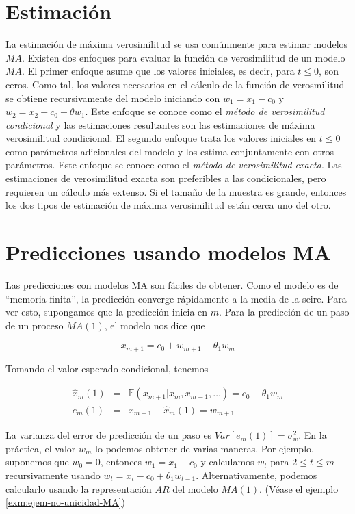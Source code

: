 \documentclass[12pt,]{krantz}
\theoremstyle{definition}
\theoremstyle{definition}
\theoremstyle{definition}
\theoremstyle{remark}
\begin{document}
\section{Estimación}\label{estimacion}

La estimación de máxima verosimilitud se usa comúnmente para estimar
modelos \(MA\). Existen dos enfoques para evaluar la función de
verosimilitud de un modelo \(MA\). El primer enfoque asume que los
valores iniciales, es decir, para \(t\leq0\), son ceros. Como tal, los
valores necesarios en el cálculo de la función de verosmilitud se
obtiene recursivamente del modelo iniciando con \(w_1=x_1-c_0\) y
\(w_2=x_2-c_0+\theta w_1\). Este enfoque se conoce como el \emph{método
de verosimilitud condicional} y las estimaciones resultantes son las
estimaciones de máxima verosimilitud condicional. El segundo enfoque
trata los valores iniciales en \(t\leq0\) como parámetros adicionales
del modelo y los estima conjuntamente con otros parámetros. Este enfoque
se conoce como el \emph{método de verosimilitud exacta}. Las
estimaciones de verosimilitud exacta son preferibles a las
condicionales, pero requieren un cálculo más extenso. Si el tamaño de la
muestra es grande, entonces los dos tipos de estimación de máxima
verosimilitud están cerca uno del otro.

\section{Predicciones usando modelos
MA}\label{predicciones-usando-modelos-ma}

Las predicciones con modelos MA son fáciles de obtener. Como el modelo
es de ``memoria finita'', la predicción converge rápidamente a la media
de la seire. Para ver esto, supongamos que la predicción inicia en
\(m\). Para la predicción de un paso de un proceso \(MA(1)\), el modelo
nos dice que

\[x_{m+1}=c_0+w_{m+1}-\theta_1w_m\]

Tomando el valor esperado condicional, tenemos

\begin{eqnarray*}
  \hat{x}_m(1) &=& \mathbb{E}(x_{m+1}|x_m,x_{m-1},\ldots) = c_0-\theta_1w_m \\
  e_m(1) &=& x_{m+1}-\hat{x}_m(1) = w_{m+1}
\end{eqnarray*}

La varianza del error de predicción de un paso es
\(Var[e_m(1)]=\sigma_w^2\). En la práctica, el valor \(w_m\) lo podemos
obtener de varias maneras. Por ejemplo, suponemos que \(w_0=0\),
entonces \(w_1=x_1-c_0\) y calculamos \(w_t\) para \(2\leq t\leq m\)
recursivamente usando \(w_t=x_t-c_0+\theta_1w_{t-1}\). Alternativamente,
podemos calcularlo usando la representación \(AR\) del modelo \(MA(1)\).
(Véase el ejemplo \ref{exm:ejem-no-unicidad-MA})
\end{document}
